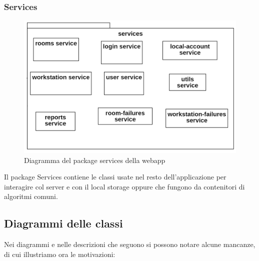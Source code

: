 \subsubsection{Services}
\begin{figure}[H]
	\centering
	\includegraphics[width=12cm]{res/images/webapp-services-diagrammaPackage.png}
	\caption{Diagramma del package services della webapp}
	\label{fig:DiagrammaPackageServicesWebapp}
\end{figure}
Il package Services contiene le classi usate nel resto dell'applicazione per interagire col server e con il local storage oppure che fungono da contenitori di algoritmi comuni.

\subsection{Diagrammi delle classi}
Nei diagrammi e nelle descrizioni che seguono si possono notare alcune mancanze, di cui illustriamo ora le motivazioni:

